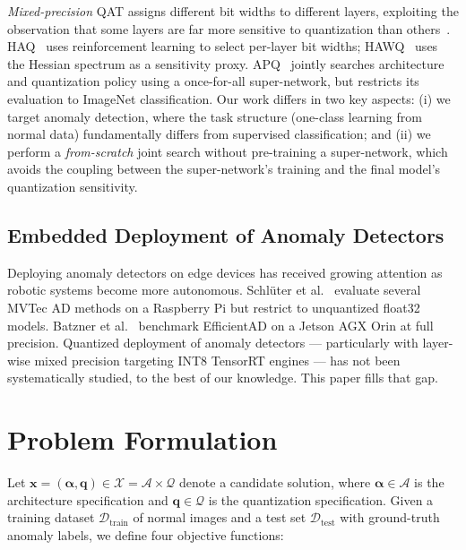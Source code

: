 \documentclass[journal]{IEEEtran}
\newcommand{\calA}{\mathcal{A}}
\newcommand{\calQ}{\mathcal{Q}}
\newcommand{\calX}{\mathcal{X}}
\begin{document}
\textit{Mixed-precision} QAT assigns different bit widths to different layers,
exploiting the observation that some layers are far more sensitive to
quantization than others~\cite{dong2019hawq,wang2019haq}.
HAQ~\cite{wang2019haq} uses reinforcement learning to select per-layer bit
widths; HAWQ~\cite{dong2019hawq} uses the Hessian spectrum as a sensitivity
proxy.
APQ~\cite{wang2020apq} jointly searches architecture and quantization policy
using a once-for-all super-network, but restricts its evaluation to ImageNet
classification.
Our work differs in two key aspects: (i) we target anomaly detection, where
the task structure (one-class learning from normal data) fundamentally differs
from supervised classification; and (ii) we perform a \emph{from-scratch}
joint search without pre-training a super-network, which avoids the coupling
between the super-network's training and the final model's quantization
sensitivity.

\subsection{Embedded Deployment of Anomaly Detectors}

Deploying anomaly detectors on edge devices has received growing attention
as robotic systems become more autonomous.
Schlüter et al.~\cite{schluter2022natural} evaluate several MVTec AD methods
on a Raspberry Pi but restrict to unquantized float32 models.
Batzner et al.~\cite{batzner2024efficientad} benchmark EfficientAD on a
Jetson AGX Orin at full precision.
Quantized deployment of anomaly detectors — particularly with layer-wise
mixed precision targeting INT8 TensorRT engines — has not been systematically
studied, to the best of our knowledge.
This paper fills that gap.

\section{Problem Formulation}
\label{sec:formulation}

Let $\bm{x} = (\bm{\alpha}, \bm{q}) \in \calX = \calA \times \calQ$ denote a
candidate solution, where $\bm{\alpha} \in \calA$ is the architecture
specification and $\bm{q} \in \calQ$ is the quantization specification.
Given a training dataset $\mathcal{D}_{\mathrm{train}}$ of normal images and
a test set $\mathcal{D}_{\mathrm{test}}$ with ground-truth anomaly labels, we
define four objective functions:
\end{document}
